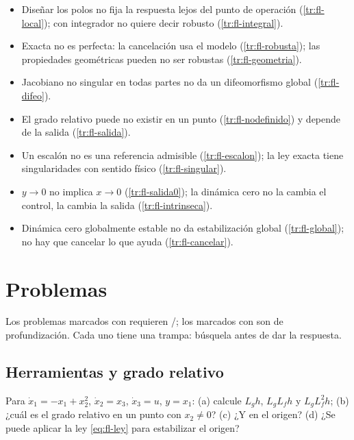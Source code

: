\begin{trampa}[title={\faBug\hspace{0.45em}Las trampas del capítulo, en una caja}]{}
\begin{itemize}
  \item Diseñar los polos no fija la respuesta lejos del punto de operación (\cref{tr:fl-local}); con integrador no quiere decir robusto (\cref{tr:fl-integral}).
  \item Exacta no es perfecta: la cancelación usa el modelo (\cref{tr:fl-robusta}); las propiedades geométricas pueden no ser robustas (\cref{tr:fl-geometria}).
  \item Jacobiano no singular en todas partes no da un difeomorfismo global (\cref{tr:fl-difeo}).
  \item El grado relativo puede no existir en un punto (\cref{tr:fl-nodefinido}) y depende de la salida (\cref{tr:fl-salida}).
  \item Un escalón no es una referencia admisible (\cref{tr:fl-escalon}); la ley exacta tiene singularidades con sentido físico (\cref{tr:fl-singular}).
  \item $y\to0$ no implica $x\to0$ (\cref{tr:fl-salida0}); la dinámica cero no la cambia el control, la cambia la salida (\cref{tr:fl-intrinseca}).
  \item Dinámica cero globalmente estable no da estabilización global (\cref{tr:fl-global}); no hay que cancelar lo que ayuda (\cref{tr:fl-cancelar}).
\end{itemize}
\end{trampa}

\section{Problemas}
\label{sec:fl-problemas}

Los problemas marcados con \etiquetaM{} requieren \matlab/\simulink; los marcados con \etiquetaEstrella{} son de profundización. Cada uno tiene una trampa: búsquela antes de dar la respuesta.

\subsection*{Herramientas y grado relativo}

\begin{problema}\label{prob:fl-grado}
Para $\dot x_1=-x_1+x_2^2$, $\dot x_2=x_3$, $\dot x_3=u$, $y=x_1$: (a) calcule $L_gh$, $L_gL_fh$ y $L_gL_f^2h$; (b) ¿cuál es el grado relativo en un punto con $x_2\neq0$? (c) ¿Y en el origen? (d) ¿Se puede aplicar la ley \eqref{eq:fl-ley} para estabilizar el origen?
\end{problema}

